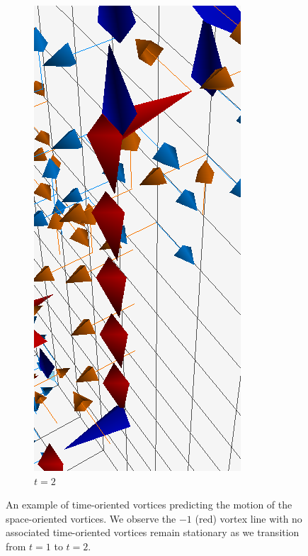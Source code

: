 \begin{figure}
\begin{subfigure}[b]{0.45\textwidth}
\includegraphics[height=0.4\textheight]{./plaqlinet2_line&monopole.png}
\caption{\label{fig:VortexMotion2}$t=2$}
\end{subfigure}
\caption{\label{fig:VortexMotion}An example of time-oriented vortices predicting the motion of the space-oriented vortices. We observe the $-1$ (red) vortex line with no associated time-oriented vortices remain stationary as we transition from $t=1$ to $t=2$.}
\end{figure}
%

